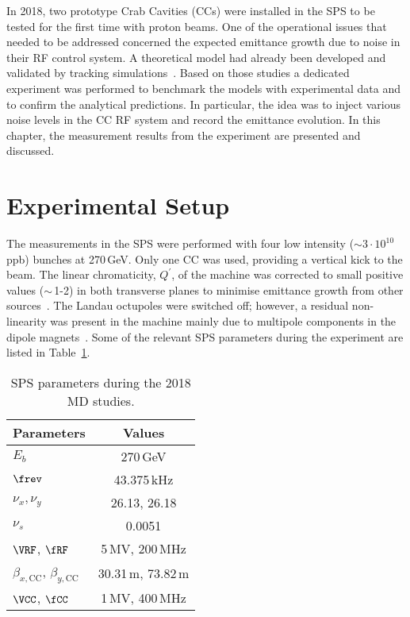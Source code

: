 In 2018, two prototype Crab Cavities (CCs) were installed in the SPS to be tested for the first time with proton beams. One of the operational issues that needed to be addressed concerned the expected emittance growth due to noise in their RF control system. A theoretical model had already been developed
and validated by tracking simulations~\cite{PhysRevSTAB.18.101001}. Based on those studies a dedicated experiment was performed to benchmark the models with experimental data and to confirm the analytical predictions. In particular, the idea was to inject various noise levels in the CC RF system and record
 the emittance evolution. In this chapter, the measurement results from the experiment are presented and discussed. 

 \section{Experimental Setup} %

The measurements in the SPS were performed with four low intensity ($\sim 3 \cdot 10^{10}$\, ppb) bunches at 270\,GeV. Only one CC was used, providing a vertical kick to the beam. The linear chromaticity, $Q^\prime$, of the machine was corrected to small positive values ($\sim$\,1-2) in both transverse planes to minimise emittance growth from other sources~\cite{Antoniou:2649815}. 
The Landau octupoles were switched off; however, a residual non-linearity was present in the machine mainly due to multipole components in the dipole magnets~\cite{Carlà:2664976, Alekou:2640326}. Some of the relevant SPS parameters during the experiment are listed in Table~\ref{tab:SPS_MD_params}. 

\begin{table}[!hbt]
    \centering
    \caption{SPS parameters during the 2018 MD studies.}
    \begin{tabular}{lc}
        \toprule
        \textbf{Parameters} & \textbf{Values}\\
        \midrule
           $E_b$  & 270\,GeV   \\ %
           $\frev$  & 43.375\,kHz  \\ %
           $\nu_x, \nu_y$    & 26.13, 26.18  \\ %
            $\nu_s$ & 0.0051   \\
            $\VRF$, $\fRF$ & 5\,MV, 200\,MHz \\
            $\beta_{x, \text{CC}}$, $\beta_{y,\text{CC}}$ &  30.31\,m, 73.82\,m \\
            $\VCC$, $\fCC$ & 1\,MV, 400\,MHz \\
       \bottomrule
    \end{tabular}
    \label{tab:SPS_MD_params}
 \end{table}